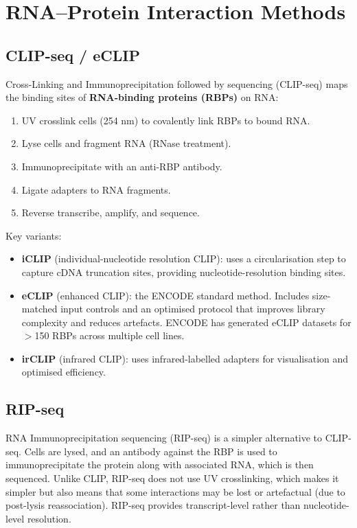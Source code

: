 \section{RNA--Protein Interaction Methods}
\label{sec:histones:clip}

\subsection{CLIP-seq / eCLIP}
\label{subsec:histones:clip}

Cross-Linking and Immunoprecipitation followed by sequencing (CLIP-seq) maps the binding sites of \textbf{RNA-binding proteins (RBPs)} on RNA:

\begin{enumerate}[itemsep=2pt]
  \item UV crosslink cells (254 nm) to covalently link RBPs to bound RNA.
  \item Lyse cells and fragment RNA (RNase treatment).
  \item Immunoprecipitate with an anti-RBP antibody.
  \item Ligate adapters to RNA fragments.
  \item Reverse transcribe, amplify, and sequence.
\end{enumerate}

Key variants:
\begin{itemize}[itemsep=2pt]
  \item \textbf{iCLIP} (individual-nucleotide resolution CLIP): uses a circularisation step to capture cDNA truncation sites, providing nucleotide-resolution binding sites.
  \item \textbf{eCLIP} (enhanced CLIP): the ENCODE standard method. Includes size-matched input controls and an optimised protocol that improves library complexity and reduces artefacts. ENCODE has generated eCLIP datasets for $>$150 RBPs across multiple cell lines.
  \item \textbf{irCLIP} (infrared CLIP): uses infrared-labelled adapters for visualisation and optimised efficiency.
\end{itemize}

\subsection{RIP-seq}
\label{subsec:histones:rip}

RNA Immunoprecipitation sequencing (RIP-seq) is a simpler alternative to CLIP-seq. Cells are lysed, and an antibody against the RBP is used to immunoprecipitate the protein along with associated RNA, which is then sequenced. Unlike CLIP, RIP-seq does not use UV crosslinking, which makes it simpler but also means that some interactions may be lost or artefactual (due to post-lysis reassociation). RIP-seq provides transcript-level rather than nucleotide-level resolution.

